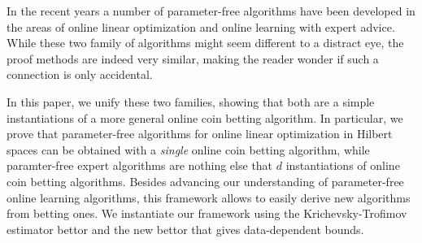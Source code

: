 In the recent years a number of parameter-free algorithms have been developed in the areas of online linear optimization and online learning with expert advice. While these two family of algorithms might seem different to a distract eye, the proof methods are indeed very similar, making the reader wonder if such a connection is only accidental.

In this paper, we unify these two families, showing that both are a simple instantiations of a more general online coin betting algorithm. 
In particular, we prove that parameter-free algorithms for online linear optimization in Hilbert spaces can be obtained with a \emph{single} online coin betting algorithm, while paramter-free expert algorithms are nothing else that $d$ instantiations of online coin betting algorithms.
Besides advancing our understanding of parameter-free online learning algorithms, this framework allows to easily derive new algorithms from betting ones. We instantiate our framework using the Krichevsky-Trofimov estimator bettor and the new bettor that gives data-dependent bounds.
